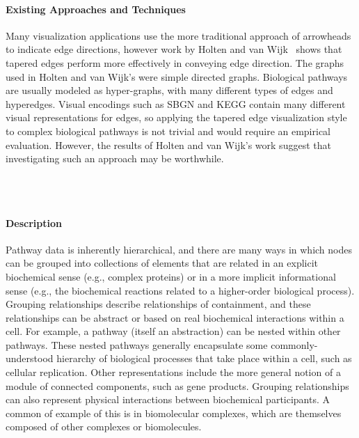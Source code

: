\documentclass[twocolumn]{bmcart}%
\begin{document}
\paragraph*{Existing Approaches and Techniques}

Many visualization applications use the more traditional approach of arrowheads to indicate edge directions, however work by Holten and van Wijk~\cite{Holten2009} shows that tapered edges perform more effectively in conveying edge direction.
The graphs used in Holten and van Wijk's were simple directed graphs.
Biological pathways are usually modeled as hyper-graphs, with many different types of edges and hyperedges.
Visual encodings such as SBGN and KEGG contain many different visual representations for edges, so applying the tapered edge visualization style to complex biological pathways is not trivial and would require an empirical evaluation.
However, the results of Holten and van Wijk's work suggest that investigating such an approach may be worthwhile.


\ \\ \

\paragraph*{Description}

Pathway data is inherently hierarchical, and there are many ways in which nodes can be grouped into collections of elements that are related in an explicit biochemical sense (e.g., complex proteins) or in a more implicit informational sense (e.g., the biochemical reactions related to a higher-order biological process).
Grouping relationships describe relationships of containment, and these relationships can be abstract or based on real biochemical interactions within a cell.
For example, a pathway (itself an abstraction) can be nested within other pathways.
These nested pathways generally encapsulate some commonly-understood hierarchy of biological processes that take place within a cell, such as cellular replication.
Other representations include the more general notion of a module of connected components, such as gene products.
Grouping relationships can also represent physical interactions between biochemical participants.
A common of example of this is in biomolecular complexes, which are themselves composed of other complexes or biomolecules.
\end{document}
